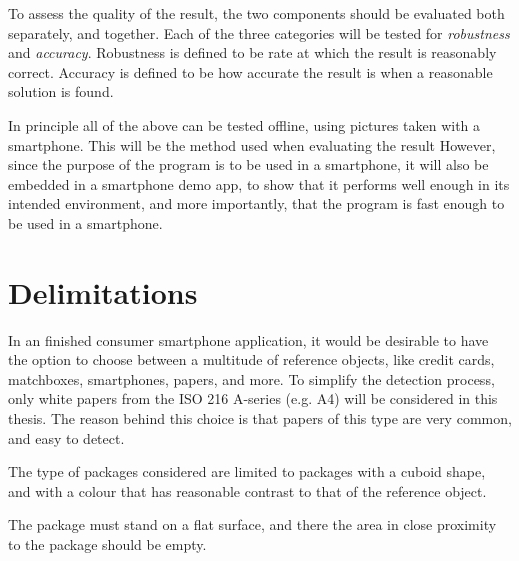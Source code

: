 To assess the quality of the result, the two components should be evaluated both separately, and together. 
Each of the three categories will be tested for \textit{robustness} and \textit{accuracy}.
Robustness is defined to be rate at which the result is reasonably correct.
Accuracy is defined to be how accurate the result is when a reasonable solution is found.

In principle all of the above can be tested offline, using pictures taken with a smartphone.
This will be the method used when evaluating the result
However, since the purpose of the program is to be used in a smartphone, it will also be embedded in a smartphone demo app, to show that it performs well enough in its intended environment, and more importantly, that the program is fast enough to be used in a smartphone.

\section{Delimitations} %
In an finished consumer smartphone application, it would be desirable to have the option to choose between a multitude of reference objects, like credit cards, matchboxes, smartphones, papers, and more. 
To simplify the detection process, only white papers from the ISO 216 A-series (e.g. A4) will be considered in this thesis.
The reason behind this choice is that papers of this type are very common, and easy to detect.

The type of packages considered are limited to packages with a cuboid shape, and with a colour that has reasonable contrast to that of the reference object.

The package must stand on a flat surface, and there the area in close proximity to the package should be empty.

